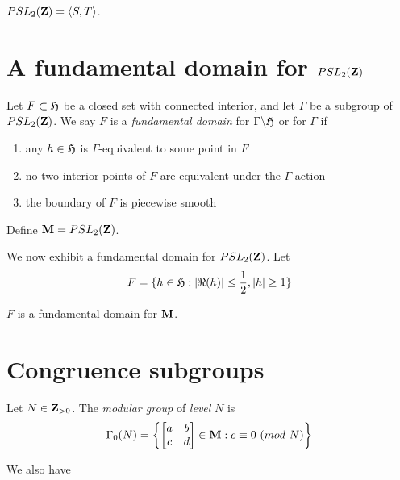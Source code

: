 \begin{prop}
  $PSL_2(\mathbf{Z}) = \langle {S, T} \rangle$.
\end{prop}


\section{A fundamental domain for $PSL_2(\mathbf{Z})$}
\label{sec:a-fundamental-domain-for-psl2-Z}

\begin{definition}
  Let $F \subset \mathfrak{H}$ be a closed set with connected interior, and
  let $\Gamma$ be a subgroup of $PSL_2(\mathbf{Z})$. We say $F$ is a \emph{fundamental
    domain} for $\Gamma \backslash \mathfrak{H}$ or for $\Gamma$ if
  \begin{enumerate}
  \item any $h \in \mathfrak{H}$ is $\Gamma$-equivalent to some point in $F$
  \item no two interior points of $F$ are equivalent under the $\Gamma$ action
  \item the boundary of $F$ is piecewise smooth
  \end{enumerate}
\end{definition}

Define $\mathbf{M} = PSL_2(\mathbf{Z})$.

We now exhibit a fundamental domain for $PSL_2(\mathbf{Z})$. Let
\[F =  \{h \in \mathfrak{H} : |\Re(h)| \le \frac12, |h| \ge 1 \}\]

\begin{prop}
  $F$ is a fundamental domain for $\mathbf{M}$.
\end{prop}

\section{Congruence subgroups}
\label{sec:congruence-subgroups}

\begin{definition}
  Let $N \in \mathbf{Z}_{>0}$. The \emph{modular group} of \emph{level} $N$ is
  \[\Gamma_0(N) = \left\{\begin{bmatrix} a&b\\c&d \end{bmatrix} \in \mathbf{M} : c
      \equiv 0 \ (\mathnormal{mod}\ N) \right\}\]
\end{definition}

We also have

